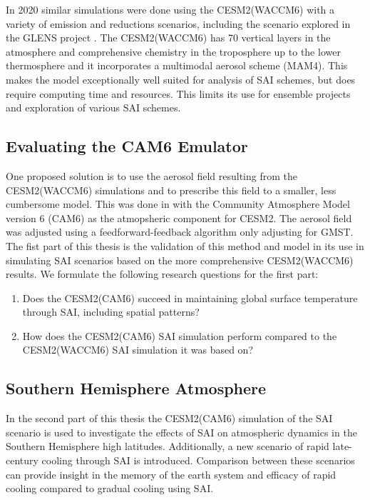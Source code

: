 In 2020 similar simulations were done using the CESM2(WACCM6) with a variety of emission and reductions scenarios, including the scenario explored in the GLENS project \parencite{tilmes2020}. The CESM2(WACCM6) has 70 vertical layers in the atmosphere and comprehensive chemistry in the troposphere up to the lower thermosphere and it incorporates a multimodal aerosol scheme (MAM4). This makes the model exceptionally well suited for analysis of SAI schemes, but does require computing time and resources. This limits its use for ensemble projects and exploration of various SAI schemes. 

\subsection{Evaluating the CAM6 Emulator}
One proposed solution is to use the aerosol field resulting from the CESM2(WACCM6) simulations and to prescribe this field to a smaller, less cumbersome model. This was done in \textcite{pfluger2024} with the Community Atmosphere Model version 6 (CAM6) as the atmopsheric component for CESM2. The aerosol field was adjusted using a feedforward-feedback algorithm only adjusting for GMST. The fist part of this thesis is the validation of this method and model in its use in simulating SAI scenarios based on the more comprehensive CESM2(WACCM6) results. 
We formulate the following research questions for the first part:

\begin{enumerate}
    \item Does the CESM2(CAM6) succeed in maintaining global surface temperature through SAI, including spatial patterns?
    \item How does the CESM2(CAM6) SAI simulation perform  compared to the CESM2(WACCM6) SAI simulation it was based on?
\end{enumerate}

\subsection{Southern Hemisphere Atmosphere}
In the second part of this thesis the CESM2(CAM6) simulation of the SAI scenario is used to investigate the effects of SAI on atmospheric dynamics in the Southern Hemisphere high latitudes. Additionally, a new scenario of rapid late-century cooling through SAI is introduced. Comparison between these scenarios can provide insight in the memory of the earth system and efficacy of rapid cooling compared to gradual cooling using SAI. 

